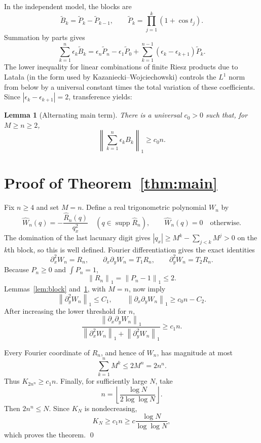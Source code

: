 \documentclass[11pt]{article}
\newtheorem{lemma}[theorem]{Lemma}
\newcommand{\norm}[1]{\left\lVert #1\right\rVert}
\begin{document}
In the independent model, the blocks are
\[
 \widetilde B_k=\widetilde P_k-\widetilde P_{k-1},
 \qquad
 \widetilde P_k=\prod_{j=1}^k(1+\cos t_j).
\]
Summation by parts gives
\[
 \sum_{k=1}^n\epsilon_k\widetilde B_k
 =\epsilon_n\widetilde P_n-\epsilon_1\widetilde P_0
  +\sum_{k=1}^{n-1}(\epsilon_k-\epsilon_{k+1})\widetilde P_k.
\]
The lower inequality for linear combinations of finite Riesz products due to
Latała (in the form used by Kazaniecki--Wojciechowski) controls the $L^1$ norm
from below by a universal constant times the total variation of these
coefficients.  Since $|\epsilon_k-\epsilon_{k+1}|=2$, transference yields:

\begin{lemma}[Alternating main term]\label{lem:mainterm}
There is a universal $c_0>0$ such that, for $M\ge n\ge2$,
\[
                       \norm{\sum_{k=1}^n\epsilon_kB_k}_1\ge c_0n.
\]
\end{lemma}

\section{Proof of Theorem~\ref{thm:main}}

Fix $n\ge4$ and set $M=n$.  Define a real trigonometric polynomial $W_n$ by
\[
 \widehat W_n(q)=-\frac{\widehat R_n(q)}{q_x^2}
 \quad(q\in\operatorname{supp}\widehat R_n),
 \qquad \widehat W_n(q)=0\quad\text{otherwise}.
\]
The domination of the last lacunary digit gives
$|q_x|\ge M^k-\sum_{j<k}M^j>0$ on the $k$th block, so this is well defined.
Fourier differentiation gives the exact identities
\[
 \partial_x^2W_n=R_n,
 \qquad \partial_x\partial_yW_n=T_1R_n,
 \qquad \partial_y^2W_n=T_2R_n.
\]
Because $P_n\ge0$ and $\int P_n=1$,
\[
                         \norm{R_n}_1=\norm{P_n-1}_1\le2.
\]
Lemmas~\ref{lem:block} and~\ref{lem:mainterm}, with $M=n$, now imply
\[
 \norm{\partial_y^2W_n}_1\le C_1,
 \qquad
 \norm{\partial_x\partial_yW_n}_1\ge c_0n-C_2.
\]
After increasing the lower threshold for $n$,
\[
 \frac{\norm{\partial_x\partial_yW_n}_1}
 {\norm{\partial_x^2W_n}_1+\norm{\partial_y^2W_n}_1}
 \ge c_1n.
\]

Every Fourier coordinate of $R_n$, and hence of $W_n$, has magnitude at most
\[
                 \sum_{k=1}^nM^k\le2M^n=2n^n.
\]
Thus $K_{2n^n}\ge c_1n$.  Finally, for sufficiently large $N$, take
\[
                  n=\left\lfloor\frac{\log N}{2\log\log N}\right\rfloor.
\]
Then $2n^n\le N$.  Since $K_N$ is nondecreasing,
\[
 K_N\ge c_1n\ge c\frac{\log N}{\log\log N},
\]
which proves the theorem. \qed
\end{document}
